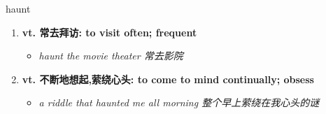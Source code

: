 
\begin{frame}
{\huge haunt}
\begin{center}
\begin{enumerate}\Large
  \item \textbf{vt. 常去拜访: to visit often; frequent}
  \begin{itemize}
    \item \em{\Large{haunt the movie theater 常去影院}}
  \end{itemize}
  \item \textbf{vt. 不断地想起,萦绕心头: to come to mind continually; obsess}
  \begin{itemize}
    \item \em{\Large{a riddle that haunted me all morning 整个早上萦绕在我心头的谜}}
  \end{itemize}
\end{enumerate}
\end{center}
\end{frame}
